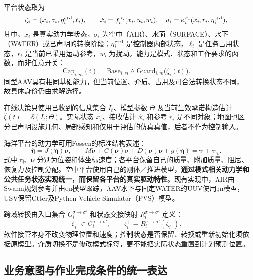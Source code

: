\documentclass[UTF8,fontset=fandol,a4paper,11pt]{ctexart}
\begin{document}
平台状态取为
\begin{equation}
 \zeta_i=(x_i,\sigma_i,\eta_i^{\rm ctrl},\ell_i),\qquad
 \dot x_i=f_i^{\sigma_i}(x_i,u_i,w_i),\quad
 u_i=\kappa_i^{\sigma_i}(x_i,r_i,\eta_i^{\rm ctrl}),
 \label{eq:hybrid}
\end{equation}
其中，$x_i$ 是真实动力学状态，$\sigma_i$ 为空中（AIR）、水面（SURFACE）、水下（WATER）或已声明的转换阶段；$\eta_i^{\rm ctrl}$ 是控制器内部状态，$\ell_i$ 是任务占用状态，$r_i$ 是当前已采用运动参考，$w_i$ 为扰动。能力是模式、状态和工作要求的函数，而非任意开关：
\begin{equation}
 \mathrm{Cap}_{i,m}(t)=
 \mathrm{Base}_{i,m}\land
 \mathrm{Guard}_{i,m}\bigl(\zeta_i(t)\bigr).
 \label{eq:capability}
\end{equation}
同型AAV具有相同基础能力，但当前位置、介质、占用及可合法转换状态不同，故具体身份仍由求解选择。

在线决策只使用已收到的信息集合 $I_t$、模型参数 $\Theta$ 及当前生效承诺构造估计 $\widehat\zeta(t)=\mathcal E(I_t;\Theta)$。实际状态 $x_i$、接收估计 $\widehat x_i$ 和参考 $r_i$ 是不同对象；地图也区分已声明设施几何、局部感知和仅用于评估的仿真真值，后者不作为控制输入。

海洋平台的动力学可用Fossen的标准结构表述\cite{fossenmodel}：
\begin{equation}
 \dot{\bm\eta}=J(\bm\eta)\bm\nu,\qquad
 M\dot{\bm\nu}+C(\bm\nu)\bm\nu+D(\bm\nu)\bm\nu+g(\bm\eta)
 =\bm\tau+\bm\tau_w.
 \label{eq:marine}
\end{equation}
式中 $\bm\eta$、$\bm\nu$ 分别为位姿和体坐标速度；各平台保留自己的质量、附加质量、阻尼、恢复力及控制分配。空中平台使用自己的刚体／推进模型，\textbf{通过模式相关动力学和公共任务状态实现统一，而保留各平台的真实驱动特性}。现有实现中，AIR由Swarm规划参考并由qn模型跟踪，AAV水下与固定WATER的UUV使用qn模型，USV保留Otter及Python Vehicle Simulator（PVS）模型。

跨域转换由入口集合 $G_i^{\sigma\to\sigma'}$ 和状态交接映射 $R_i^{\sigma\to\sigma'}$ 定义：
\begin{equation}
 \zeta_i^-\in G_i^{\sigma\to\sigma'},\qquad
 \zeta_i^+=R_i^{\sigma\to\sigma'}(\zeta_i^-).
 \label{eq:transition}
\end{equation}
软件接管本身不改变物理位置和速度；控制状态是否保留、转换或重新初始化须依据原模型。介质切换不是修改模式标签，更不能把实际状态重置到计划预测位置。

\subsection{业务意图与作业完成条件的统一表达}
\end{document}
